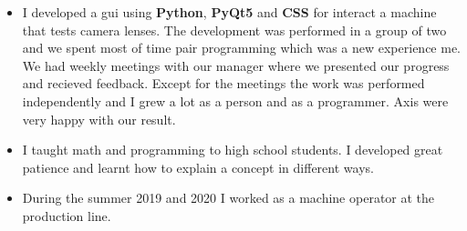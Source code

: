 \documentclass[10pt,a4paper,ragged2e]{altacv}
\begin{document}
\divider

\begin{itemize}
    \item I developed a gui using \textbf{Python}, \textbf{PyQt5} and \textbf{CSS} for interact a machine 
    that tests camera lenses. The development was performed in a group of two and we spent most of time 
    pair programming which was a new experience me. We had weekly meetings with our manager where we presented
    our progress and recieved feedback. Except for the meetings the work was performed independently and I grew 
    a lot as a person and as a programmer. Axis were very happy with our result.
\end{itemize}

\divider

    \begin{itemize}
    \item I taught math and programming to high school students. 
    I developed great patience and learnt how to explain a concept in different ways.
\end{itemize}

\divider

\begin{itemize}
    \item During the summer 2019 and 2020 I worked as a machine operator at the production 
    line.
\end{itemize}

\newpage
\end{document}

